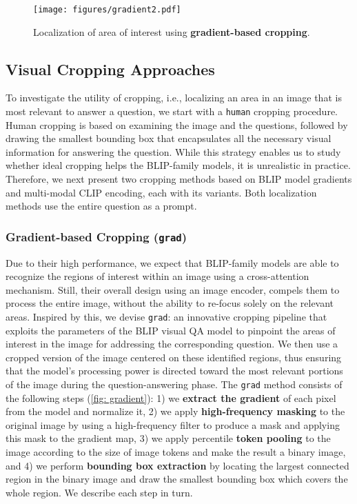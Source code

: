 \begin{figure}[!t]
    \centering
    \texttt{[image: figures/gradient2.pdf]}
    \caption{Localization of area of interest using \textbf{gradient-based cropping}.}
    \label{fig: gradient}
\end{figure}

\subsection{Visual Cropping Approaches}

To investigate the utility of cropping, i.e., localizing an area in an image that is most relevant to answer a question, we start with a \texttt{human} cropping procedure. Human cropping is based on examining the image and the questions, followed by drawing the smallest bounding box that encapsulates all the necessary visual information for answering the question. While this strategy enables us to study whether ideal cropping helps the BLIP-family models, it is unrealistic in practice. Therefore, we next present two cropping methods based on BLIP model gradients and multi-modal CLIP encoding, each with its variants. Both localization methods use the entire question as a prompt.



\subsubsection{Gradient-based Cropping (\texttt{grad})}


Due to their high performance, we expect that BLIP-family models are able to recognize the regions of interest within an image using a cross-attention mechanism. Still, their overall design using an image encoder, compels them to process the entire image, without the ability to re-focus solely on the relevant areas. Inspired by this, we devise \texttt{grad}: an innovative cropping pipeline that exploits the parameters of the BLIP visual QA model to pinpoint the areas of interest in the image for addressing the corresponding question. We then use a cropped version of the image centered on these identified regions, thus
ensuring that the model's processing power is directed toward the most relevant portions of the image during the question-answering phase. 
The \texttt{grad} method consists of the following steps (\autoref{fig: gradient}): 1) we \textbf{extract the gradient} of each pixel from the model and normalize it, 2) we apply \textbf{high-frequency masking} to the original image by using a high-frequency filter to produce a mask and applying this mask to the gradient map, 3) we apply percentile\textbf{ token pooling} to the image according to the size of image tokens and make the result a binary image, and 4) we perform \textbf{bounding box extraction} by locating the largest connected region in the binary image and draw the smallest bounding box which covers the whole region. We describe each step in turn.

